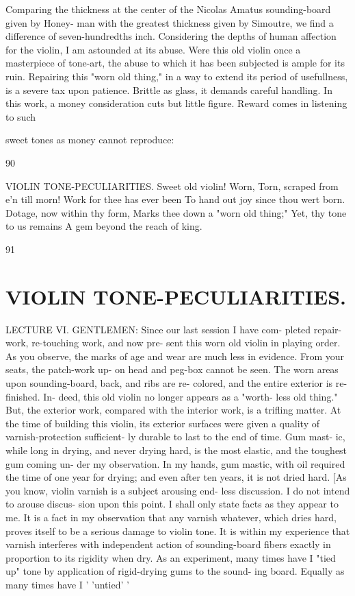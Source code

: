 \documentclass{article}
\begin{document}
Comparing the thickness at the center of the Nicolas Amatus sounding-board given by Honey- man with the greatest thickness given by Simoutre, we find a difference of seven-hundredths inch. Considering the depths of human affection for the violin, I am astounded at its abuse. Were this old violin once a masterpiece of tone-art, the abuse to which it has been subjected is ample for its ruin. Repairing this "worn old thing," in a way to extend its period of usefullness, is a severe tax upon patience. Brittle as glass, it demands careful handling. In this work, a money consideration cuts but little figure. Reward comes in listening to such

sweet tones as money cannot reproduce:

90

VIOLIN TONE-PECULIARITIES. Sweet old violin! Worn, Torn, scraped from e'n till morn! Work for thee has ever been To hand out joy since thou wert born. Dotage, now within thy form, Marks thee down a "worn old thing;" Yet, thy tone to us remains A gem beyond the reach of king.

91

\section*{VIOLIN TONE-PECULIARITIES.}
LECTURE VI. GENTLEMEN: Since our last session I have com- pleted repair-work, re-touching work, and now pre- sent this worn old violin in playing order. As you observe, the marks of age and wear are much less in evidence. From your seats, the patch-work up- on head and peg-box cannot be seen. The worn areas upon sounding-board, back, and ribs are re- colored, and the entire exterior is re-finished. In- deed, this old violin no longer appears as a "worth- less old thing." But, the exterior work, compared with the interior work, is a trifling matter. At the time of building this violin, its exterior surfaces were given a quality of varnish-protection sufficient- ly durable to last to the end of time. Gum mast- ic, while long in drying, and never drying hard, is the most elastic, and the toughest gum coming un- der my observation. In my hands, gum mastic, with oil required the time of one year for drying; and even after ten years, it is not dried hard. [As you know, violin varnish is a subject arousing end- less discussion. I do not intend to arouse discus- sion upon this point. I shall only state facts as they appear to me. It is a fact in my observation that any varnish whatever, which dries hard, proves itself to be a serious damage to violin tone. It is within my experience that varnish interferes with independent action of sounding-board fibers exactly in proportion to its rigidity when dry. As an experiment, many times have I "tied up" tone by application of rigid-drying gums to the sound- ing board. Equally as many times have I ' 'untied' '
\end{document}
